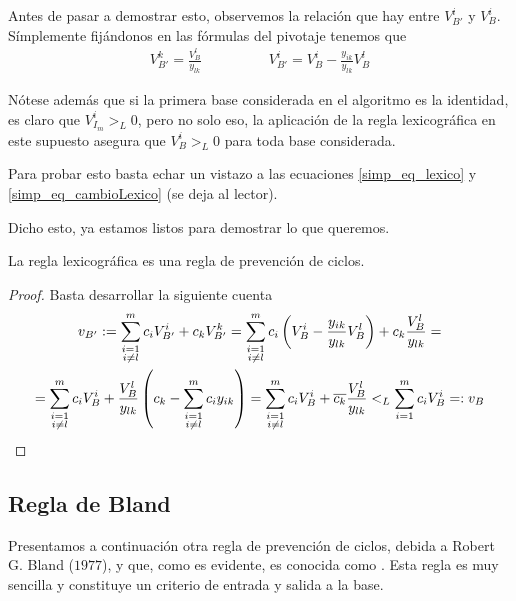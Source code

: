 Antes de pasar a demostrar esto, observemos la relación que hay entre $V_{B'}^i$ y $V_B^i$. Símplemente fijándonos en las fórmulas del pivotaje tenemos que
\begin{equation}
\label{simp_eq_cambioLexico}
	\begin{array}{cc}
		\displaystyle{V_{B'}^k=\frac{V_B^l}{y_{lk}}}\qquad&\qquad \displaystyle{V_{B'}^i=V_B^i-\frac{y_{ik}}{y_{lk}}V_B^l}
	\end{array}
\end{equation}
\begin{obs}[Positividad]
	Nótese además que si la primera base considerada en el algoritmo es la identidad, es claro que $V_{I_m}^i>_L0$, pero no solo eso, la aplicación de la regla lexicográfica en este supuesto asegura que $V_B^i>_L0$ para toda base considerada.
	
	Para probar esto basta echar un vistazo a las ecuaciones \eqref{simp_eq_lexico} y \eqref{simp_eq_cambioLexico} (se deja al lector).
\end{obs}
Dicho esto, ya estamos listos para demostrar lo que queremos.
\begin{prop}
	La regla lexicográfica es una regla de prevención de ciclos.
\end{prop}
\begin{proof}
	Basta desarrollar la siguiente cuenta
	\begin{multline*}
		v_{B'}:=\sum_{\substack{i=1\\i\not=l}}^{m}c_iV_{B'}^i+c_kV_{B'}^k=\sum_{\substack{i=1\\i\not=l}}^{m}c_i\left(V_B^i-\frac{y_{ik}}{y_{lk}}V_B^l\right)+c_k\frac{V_B^l}{y_{lk}}=\\=\sum_{\substack{i=1\\i\not=l}}^{m}c_iV_B^i+\frac{V_B^l}{y_{lk}}\left(c_k-\sum_{\substack{i=1\\i\not=l}}^{m}c_iy_{ik}\right)=\sum_{\substack{i=1\\i\not=l}}^{m}c_iV_B^i+\overline{c_k}\frac{V_B^l}{y_{lk}}<_L\sum_{i=1}^{m}c_iV_B^i=:v_B\qedhere
	\end{multline*}
\end{proof}
\subsection{Regla de Bland}
Presentamos a continuación otra regla de prevención de ciclos, debida a Robert G. Bland ($1977$), y que, como es evidente, es conocida como . Esta regla es muy sencilla y constituye un criterio de entrada y salida a la base.

